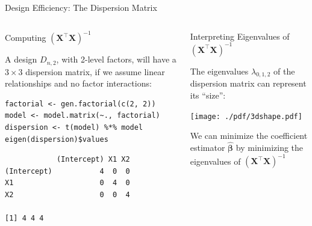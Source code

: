 \documentclass[10pt, compress, aspectratio=169, xcolor={table,usenames,dvipsnames}]{beamer}
\begin{document}
\begin{frame}[label={sec:org1b59a99},fragile]{Design Efficiency: The Dispersion Matrix}
 \addtocounter{framenumber}{-1}
\begin{columns}
\begin{column}{0.5\columnwidth}
\begin{block}{Computing \(\left(\bm{X}^{\intercal}\bm{X}\right)^{-1}\)}
\vspace{.2cm}

A design \(D_{n,2}\), with \alert{2-level factors}, will have a \(3\times3\)
\alert{dispersion matrix}, if we assume \alert{linear relationships} and no \alert{factor
interactions}:

\vspace{.2cm}

\scriptsize

\lstset{language=r,label= ,caption= ,captionpos=b,numbers=none}
\begin{lstlisting}
factorial <- gen.factorial(c(2, 2))
model <- model.matrix(~., factorial)
dispersion <- t(model) %*% model
eigen(dispersion)$values
\end{lstlisting}

\vspace{-.4cm}

\begin{verbatim}
            (Intercept) X1 X2
(Intercept)           4  0  0
X1                    0  4  0
X2                    0  0  4

[1] 4 4 4
\end{verbatim}


\normalsize
\end{block}
\end{column}

\begin{column}{0.5\columnwidth}
\begin{block}{Interpreting Eigenvalues of \(\left(\bm{X}^{\intercal}\bm{X}\right)^{-1}\)}
\vspace{.1cm}

The \alert{eigenvalues} \(\lambda_{0,1,2}\) of the \alert{dispersion matrix} can
represent its \alert{``size''}:

\vspace{-.3cm}

\begin{center}
\texttt{[image: ./pdf/3dshape.pdf]}
\end{center}

\vspace{-.3cm}

We can \alert{minimize the coefficient estimator} \(\bm{\hat{\beta}}\) by
\alert{minimizing the eigenvalues} of \(\left(\bm{X}^{\intercal}\bm{X}\right)^{-1}\)
\end{block}
\end{column}
\end{columns}
\end{frame}
\end{document}
